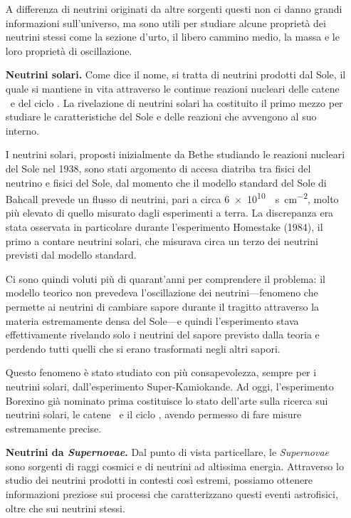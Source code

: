 \begin{enumerate}[wide = 0pt, leftmargin = 1.5\parindent]
            A differenza di neutrini originati da altre sorgenti questi non ci danno grandi informazioni sull'universo, ma sono utili per studiare alcune proprietà dei neutrini stessi come la sezione d'urto, il libero cammino medio, la massa e le loro proprietà di oscillazione.

            \item[\textbf{Neutrini solari.}] Come dice il nome, si tratta di neutrini prodotti dal Sole, il quale si mantiene in vita attraverso le continue reazioni nucleari delle catene \proton\proton\ e del ciclo . La rivelazione di neutrini solari ha costituito il primo mezzo per studiare le caratteristiche del Sole e delle reazioni che avvengono al suo interno.
            
            I neutrini solari, proposti inizialmente da Bethe studiando le reazioni nucleari del Sole nel 1938, sono stati argomento di accesa diatriba tra fisici del neutrino e fisici del Sole, dal momento che il modello standard del Sole di Bahcall prevede un flusso di neutrini, pari a circa \SI{6e+10}{\per\second\per\centi\meter\squared}, molto più elevato di quello misurato dagli esperimenti a terra. La discrepanza era stata osservata in particolare durante l'esperimento Homestake (1984), il primo a contare neutrini solari, che misurava circa un terzo dei neutrini previsti dal modello standard.

            Ci sono quindi voluti più di quarant'anni per comprendere il problema: il modello teorico non prevedeva l'oscillazione dei neutrini---fenomeno che permette ai neutrini di cambiare sapore durante il tragitto attraverso la materia estremamente densa del Sole---e quindi l'esperimento stava effettivamente rivelando solo i neutrini del sapore previsto dalla teoria e perdendo tutti quelli che si erano trasformati negli altri sapori.

            Questo fenomeno è stato studiato con più consapevolezza, sempre per i neutrini solari, dall'esperimento Super-Kamiokande. Ad oggi, l'esperimento Borexino già nominato prima costituisce lo stato dell'arte sulla ricerca sui neutrini solari, le catene \proton\proton\ e il ciclo , avendo permesso di fare misure estremamente precise.

            \item[\textbf{Neutrini da \textit{Supernovae}.}] Dal punto di vista particellare, le \textit{Supernovae} sono sorgenti di raggi cosmici e di neutrini ad altissima energia. Attraverso lo studio dei neutrini prodotti in contesti così estremi, possiamo ottenere informazioni preziose sui processi che caratterizzano questi eventi astrofisici, oltre che sui neutrini stessi.
            

\end{enumerate}
